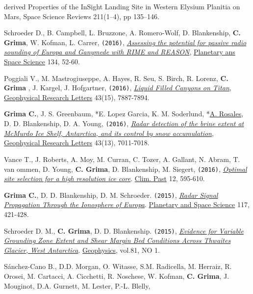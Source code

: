 \begin{etaremune}
{{  derived Properties of the InSight Landing Site in Western Elysium
  Planitia on Mars}}, Space Science Reviews 211(1–4), pp 135–146.
\item
  Schroeder D., B. Campbell, L. Bruzzone, A. Romero-Wolf, D.
  Blankenship, \textbf{C. Grima}, W. Kofman, L. Carrer, \texttt{(2016)},
  \href{http://www.sciencedirect.com/science/article/pii/S0032063316301465}{\emph{Assessing
  the potential for passive radio sounding of Europa and Ganymede with
  RIME and REASON}}, \ul{Planetary ans Space Science} 134,  52-60.
\item
  Poggiali V., M. Mastrogiuseppe, A. Hayes, R. Seu, S. Birch, R. Lorenz,
  \textbf{C. Grima }, J. Kargel, J. Hofgartner, \texttt{(2016)},
  \href{http://onlinelibrary.wiley.com/doi/10.1002/2016GL069679/abstract}{\emph{Liquid
  Filled Canyons on Titan}}, \ul{Geophysical Research Letters} 43(15), 7887-7894.
\item
  \textbf{Grima C.}, J. S. Greenbaum, *E. Lopez Garcia, K.
  M. Soderlund, *\ul{A. Rosales}, D. D. Blankenship, D. A. Young,
  \texttt{(2016)},
  \href{http://onlinelibrary.wiley.com/doi/10.1002/2016GL069524/pdf}{\emph{Radar
  detection of the brine extent at McMurdo Ice Shelf, Antarctica, and
  its control by snow accumulation}}, \ul{Geophysical Research Letters} 43(13), 7011-7018.
\item
  Vance T., J. Roberts, A. Moy, M. Curran, C. Tozer, A. Gallant, N.
  Abram, T. van ommen, D. Young, \textbf{C. Grima}, D. Blankenship, M.
  Siegert, \texttt{(2016)},
  \href{http://www.clim-past.net/12/595/2016/cp-12-595-2016.pdf}{\emph{Optimal
  site selection for a high resolution ice core}}. \ul{Clim. Past} 12,
  595-610.
\item
  \textbf{Grima C.}, D. D. Blankenship, D. M. Schroeder. \texttt{(2015)},
  \emph{\href{http://www.sciencedirect.com/science/article/pii/S0032063315002470}{Radar
  Signal Propagation Through the Ionosphere of Europa}}. \ul{Planetary and
  Space Science} 117, 421-428.
\item
  Schroeder D. M., \textbf{C. Grima}, D. D. Blankenship. \texttt{(2015)},
  \emph{\href{http://library.seg.org/doi/abs/10.1190/geo2015-0122.1}{Evidence
  for Variable Grounding Zone Extent and Shear Margin Bed Conditions
  Across Thwaites Glacier, West Antarctica}}. \ul{Geophysics}, vol.81, NO 1.
\item
  Sánchez-Cano B., D.D. Morgan, O. Witasse, S.M. Radicella, M. Herraiz,
  R. Orosei, M. Cartacci, A. Cicchetti, R. Noschese, W. Kofman,
  \textbf{C. Grima}, J. Mouginot, D.A. Gurnett, M. Lester, P.-L. Blelly,

\end{etaremune}

